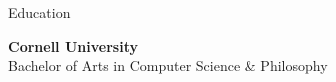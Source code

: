 
\begin{rSection}{Education}

	{\bf \large{Cornell University}} \hfill \color{darkgray}{2021 - 2025}
	\\ 
	Bachelor of Arts in Computer Science \& Philosophy

\end{rSection}